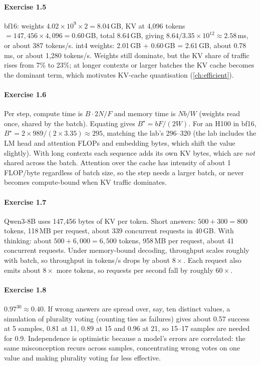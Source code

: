 \paragraph{Exercise 1.5}
bf16: weights $4.02\times10^9\times2=8.04$\,GB, KV at 4{,}096 tokens $=147{,}456\times4{,}096=0.60$\,GB, total
8.64\,GB, giving $8.64/3.35\times10^{12}\approx2.58$\,ms, or about 387 tokens/s. int4 weights: 2.01\,GB + 0.60\,GB =
2.61\,GB, about 0.78\,ms, or about 1{,}280 tokens/s. Weights still dominate, but the KV share of traffic rises from
7\% to 23\%; at longer contexts or larger batches the KV cache becomes the dominant term, which motivates
KV-cache quantisation (\cref{ch:efficient}).

\paragraph{Exercise 1.6}
Per step, compute time is $B\cdot2N/F$ and memory time is $Nb/W$ (weights read once, shared by the batch).
Equating gives $B^\star=bF/(2W)$. For an H100 in bf16, $B^\star=2\times989/(2\times3.35)\approx295$, matching the
lab's 296--320 (the lab includes the LM head and attention FLOPs and embedding bytes, which shift the
value slightly). With long contexts each sequence adds its own KV bytes, which are \emph{not} shared across
the batch. Attention over the cache has intensity of about 1\,FLOP/byte regardless of batch size, so the step
needs a larger batch, or never becomes compute-bound when KV traffic dominates.

\paragraph{Exercise 1.7}
Qwen3-8B uses 147{,}456 bytes of KV per token. Short answers: $500+300=800$ tokens, 118\,MB per request, about
339 concurrent requests in 40\,GB. With thinking: about $500+6{,}000=6{,}500$ tokens, 958\,MB per request, about 41
concurrent requests. Under memory-bound decoding, throughput scales roughly with batch, so throughput in
tokens/s drops by about $8\times$. Each request also emits about $8\times$ more tokens, so requests per second fall by
roughly $60\times$.

\paragraph{Exercise 1.8}
$0.97^{30}\approx0.40$. If wrong answers are spread over, say, ten distinct values, a simulation of plurality
voting (counting ties as failures) gives about 0.57 success at 5 samples, 0.81 at 11, 0.89 at 15 and 0.96 at 21,
so 15--17 samples are needed for 0.9. Independence is optimistic because a model's errors are correlated: the
same misconception recurs across samples, concentrating wrong votes on one value and making plurality voting
far less effective.

